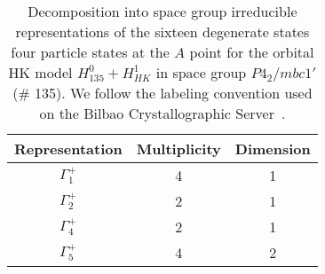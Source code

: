 \documentclass[prb,aps,amssymb,twocolumn,notitlepage]{revtex4-2}
\begin{document}
\begin{table}[ht]
\centering %
\renewcommand*{\arraystretch}{1}
\begin{tabular}{c c c} %
\hline\hline %
Representation & Multiplicity & Dimension\\[0.5ex]
\hline %
$\Gamma^{+}_{1}$&4&1\\
$\Gamma^{+}_{2}$&2&1\\
$\Gamma^{+}_{4}$&2&1\\
$\Gamma^{+}_{5}$&4&2\\
\hline %
\end{tabular}
\caption{Decomposition into space group irreducible representations of the sixteen degenerate states four particle states at the $A$ point for the orbital HK model $H^0_{135}+H^1_{HK}$ in space group $P4_2/mbc1'$ (\# 135). 
We follow the labeling convention used on the Bilbao Crystallographic Server~\cite{aroyo2006bilbaoa,aroyo2006bilbao,aroyo2011crystallography,elcoro2017double}.}
\label{table:Ainvariantsubspaces} %
\end{table}
\end{document}
